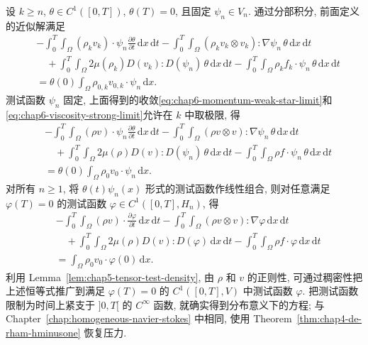 \begin{sloppypar}
\begin{itemize}
 设 $k\geq n$, $\theta\in C^1([0,T])$, $\theta(T)=0$, 且固定 $\psi_n\in V_n$. 通过分部积分, 前面定义的近似解满足
 \[
 \begin{aligned}
 &-\int_0^T\int_\Omega(\rho_kv_k)\cdot\psi_n\frac{\partial\theta}{\partial t}
 \,\mathrm dx\,\mathrm dt
 -\int_0^T\int_\Omega(\rho_kv_k\otimes v_k):\nabla\psi_n\,\theta
 \,\mathrm dx\,\mathrm dt\\
 &\quad+\int_0^T\int_\Omega2\mu(\rho_k)D(v_k):D(\psi_n)\,\theta
 \,\mathrm dx\,\mathrm dt
 -\int_0^T\int_\Omega\rho_kf_k\cdot\psi_n\,\theta
 \,\mathrm dx\,\mathrm dt\\
 &=\theta(0)\int_\Omega\rho_{0,k}v_{0,k}\cdot\psi_n\,\mathrm dx.
 \end{aligned}
 \]
 测试函数 $\psi_n$ 固定, 上面得到的收敛\eqref{eq:chap6-momentum-weak-star-limit}和\eqref{eq:chap6-viscosity-strong-limit}允许在 $k$ 中取极限, 得
 \[
 \begin{aligned}
 &-\int_0^T\int_\Omega(\rho v)\cdot\psi_n\frac{\partial\theta}{\partial t}
 \,\mathrm dx\,\mathrm dt
 -\int_0^T\int_\Omega(\rho v\otimes v):\nabla\psi_n\,\theta
 \,\mathrm dx\,\mathrm dt\\
 &\quad+\int_0^T\int_\Omega2\mu(\rho)D(v):D(\psi_n)\,\theta
 \,\mathrm dx\,\mathrm dt
 -\int_0^T\int_\Omega\rho f\cdot\psi_n\,\theta
 \,\mathrm dx\,\mathrm dt\\
 &=\theta(0)\int_\Omega\rho_0v_0\cdot\psi_n\,\mathrm dx.
 \end{aligned}
 \]
 对所有 $n\geq1$, 将 $\theta(t)\psi_n(x)$ 形式的测试函数作线性组合, 则对任意满足 $\varphi(T)=0$ 的测试函数 $\varphi\in C^1([0,T],H_n)$, 得
 \begin{equation}
 \begin{aligned}
 &-\int_0^T\int_\Omega(\rho v)\cdot\frac{\partial\varphi}{\partial t}
 \,\mathrm dx\,\mathrm dt
 -\int_0^T\int_\Omega(\rho v\otimes v):\nabla\varphi\,\mathrm dx\,\mathrm dt\\
 &\quad+\int_0^T\int_\Omega2\mu(\rho)D(v):D(\varphi)\,\mathrm dx\,\mathrm dt
 -\int_0^T\int_\Omega\rho f\cdot\varphi\,\mathrm dx\,\mathrm dt\\
 &=\int_\Omega\rho_0v_0\cdot\varphi(0)\,\mathrm dx.
 \end{aligned}
 \label{eq:chap6-limit-momentum-weak-form}
 \end{equation}
 利用 Lemma~\ref{lem:chap5-tensor-test-density}, 由 $\rho$ 和 $v$ 的正则性, 可通过稠密性把上述恒等式推广到满足 $\varphi(T)=0$ 的 $C^1([0,T],V)$ 中测试函数 $\varphi$. 把测试函数限制为时间上紧支于 $]0,T[$ 的 $C^\infty$ 函数, 就确实得到分布意义下的方程; 与 Chapter~\ref{chap:homogeneous-navier-stokes} 中相同, 使用 Theorem~\ref{thm:chap4-de-rham-hminusone} 恢复压力.


\end{itemize}
\end{sloppypar}
